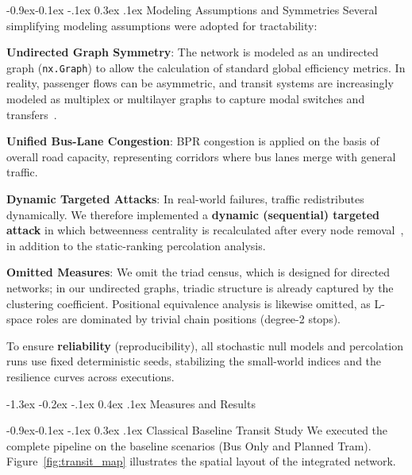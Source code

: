 \documentclass[12pt, a4paper]{article}
\makeatletter
\renewcommand\section{\@startsection {section}{1}{\z@}%
                                   {-1.3ex \@plus -0.2ex \@minus -.1ex}%
                                   {0.4ex \@plus.1ex}%
                                   {\normalfont\Large\bfseries}}
\renewcommand\subsection{\@startsection{subsection}{2}{\z@}%
                                     {-0.9ex\@plus -0.1ex \@minus -.1ex}%
                                     {0.3ex \@plus .1ex}%
                                     {\normalfont\large\bfseries}}
\let\olditemize\itemize
\let\endolditemize\enditemize
\renewenvironment{itemize}{\olditemize\setlength{\itemsep}{0pt}\setlength{\parskip}{0pt}\setlength{\parsep}{0pt}\setlength{\topsep}{0pt}\setlength{\partopsep}{0pt}}{\endolditemize}
\makeatother
\begin{document}
\subsection{Modeling Assumptions and Symmetries}
Several simplifying modeling assumptions were adopted for tractability:
\begin{itemize}
    \item \textbf{Undirected Graph Symmetry}: The network is modeled as an undirected graph (\texttt{nx.Graph}) to allow the calculation of standard global efficiency metrics. In reality, passenger flows can be asymmetric, and transit systems are increasingly modeled as multiplex or multilayer graphs to capture modal switches and transfers~\cite{dedomenico}.
    \item \textbf{Unified Bus-Lane Congestion}: BPR congestion is applied on the basis of overall road capacity, representing corridors where bus lanes merge with general traffic.
    \item \textbf{Dynamic Targeted Attacks}: In real-world failures, traffic redistributes dynamically. We therefore implemented a \textbf{dynamic (sequential) targeted attack} in which betweenness centrality is recalculated after every node removal~\cite{albert}, in addition to the static-ranking percolation analysis.
    \item \textbf{Omitted Measures}: We omit the triad census, which is designed for directed networks; in our undirected graphs, triadic structure is already captured by the clustering coefficient. Positional equivalence analysis is likewise omitted, as L-space roles are dominated by trivial chain positions (degree-2 stops).
\end{itemize}

To ensure \textbf{reliability} (reproducibility), all stochastic null models and percolation runs use fixed deterministic seeds, stabilizing the small-world indices and the resilience curves across executions.

\section{Measures and Results}
\label{measures-results}

\subsection{Classical Baseline Transit Study}
We executed the complete pipeline on the baseline scenarios (Bus Only and Planned Tram). Figure~\ref{fig:transit_map} illustrates the spatial layout of the integrated network.
\end{document}
